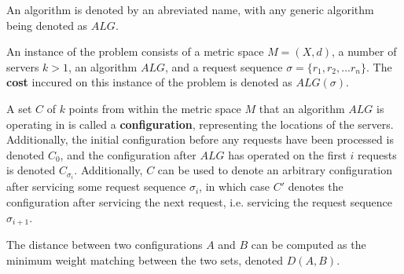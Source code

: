 \begin{definition}
    An algorithm is denoted by an abreviated name, with any generic algorithm being denoted as $ALG$.
\end{definition}

\begin{definition}
    An instance of the \KS problem consists of a metric space $M = (X,d)$, a number of servers $k >1$, an algorithm $ALG$, and a request sequence $\sigma = \{ r_1, r_2, ... r_n\}$. The \textbf{cost} inccured on this instance of the \KS problem is denoted as $ALG(\sigma)$.
\end{definition}

\begin{definition}
    A set $C$ of $k$ points from within the metric space $M$ that an algorithm $ALG$ is operating in is called a \textbf{configuration}, representing the locations of the servers. Additionally, the initial configuration before any requests have been processed is denoted $C_0$, and the configuration after $ALG$ has operated on the first $i$ requests is denoted $C_{\sigma_i}$. Additionally, $C$ can be used to denote an arbitrary configuration after servicing some request sequence $\sigma_i$, in which case $C'$ denotes the configuration after servicing the next request, i.e. servicing the request sequence $\sigma_{i+1}$.
\end{definition}

\begin{definition}
    The distance between two configurations $A$ and $B$ can be computed as the minimum weight matching between the two sets, denoted $D(A, B)$.
\end{definition}

